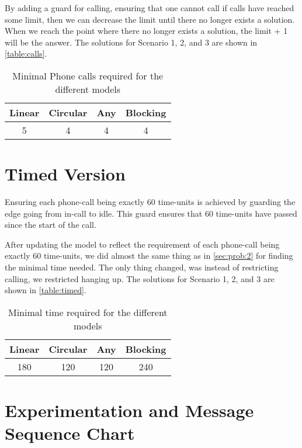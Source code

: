 \documentclass{article}
\begin{document}
By adding a guard for calling, ensuring that one cannot call if calls have reached some limit, then we can decrease the limit until there no longer exists a solution. When we reach the point where there no longer exists a solution, the limit + 1 will be the answer. The solutions for Scenario 1, 2, and 3 are shown in \autoref{table:calls}.

\begin{table}[h!]
    \centering
    \begin{tabular}{||c c c c||} 
        \hline
        Linear & Circular & Any & Blocking \\ [0.5ex] 
        \hline\hline
        5 & 4 & 4 & 4 \\ [1ex] 
        \hline
    \end{tabular}
    \caption{Minimal Phone calls required for the different models}
    \label{table:calls}
\end{table}

\section*{Timed Version}

Ensuring each phone-call being exactly 60 time-units is achieved by guarding the edge going from in-call to idle. This guard ensures that 60 time-units have passed since the start of the call.

After updating the model to reflect the requirement of each phone-call being exactly 60 time-units, we did almost the same thing as in \autoref{sec:prob:2} for finding the minimal time needed. The only thing changed, was instead of restricting calling, we restricted hanging up. The solutions for Scenario 1, 2, and 3 are shown in \autoref{table:timed}.

\begin{table}[h!]
    \centering
    \begin{tabular}{||c c c c||} 
        \hline
        Linear & Circular & Any & Blocking \\ [0.5ex] 
        \hline\hline
        180 & 120 & 120 & 240 \\ [1ex] 
        \hline
    \end{tabular}
    \caption{Minimal time required for the different models}
    \label{table:timed}
\end{table}

\section*{Experimentation and Message Sequence Chart}
\end{document}
